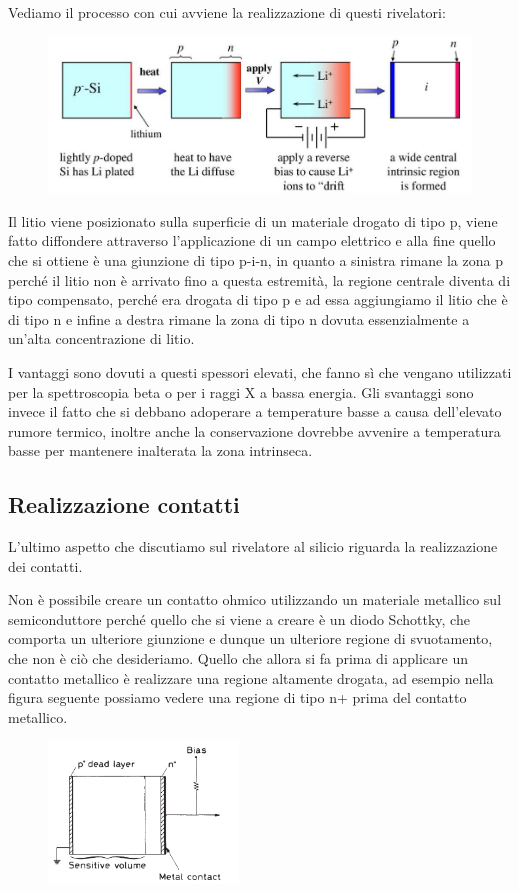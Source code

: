 Vediamo il processo con cui avviene la realizzazione di questi rivelatori:
\begin{figure}[H]
   \centering
   \includegraphics[width=\textwidth]{immagini/rivelatore_a_deriva_di_litio.png}
\end{figure}
Il litio viene posizionato sulla superficie di un materiale drogato di tipo p, viene fatto diffondere attraverso l'applicazione di un campo elettrico e alla fine quello che si ottiene è una giunzione di tipo p-i-n, in quanto a sinistra rimane la zona p perché il litio non è arrivato fino a questa estremità, la regione centrale diventa di tipo compensato, perché era drogata di tipo p e ad essa aggiungiamo il litio che è di tipo n e infine a destra rimane la zona di tipo n dovuta essenzialmente a un'alta concentrazione di litio.

I vantaggi sono dovuti a questi spessori elevati, che fanno sì che vengano utilizzati per la spettroscopia beta o per i raggi X a bassa energia. Gli svantaggi sono invece il fatto che si debbano adoperare a temperature basse a causa dell'elevato rumore termico, inoltre anche la conservazione dovrebbe avvenire a temperatura basse per mantenere inalterata la zona intrinseca.

\subsection{Realizzazione contatti}
L'ultimo aspetto che discutiamo sul rivelatore al silicio riguarda la realizzazione dei contatti. 

Non è possibile creare un contatto ohmico utilizzando un materiale metallico sul semiconduttore perché quello che si viene a creare è un diodo Schottky, che comporta un ulteriore giunzione e dunque un ulteriore regione di svuotamento, che non è ciò che desideriamo. Quello che allora si fa prima di applicare un contatto metallico è realizzare una regione altamente drogata, ad esempio nella figura seguente possiamo vedere una regione di tipo n+ prima del contatto metallico.
\begin{figure}[H]
   \centering
   \includegraphics[width=0.45\textwidth]{immagini/realizzazione_contatti.png}
\end{figure}

